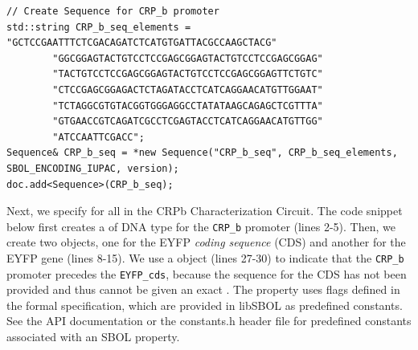 \begin{minipage}{0.95\textwidth}
\begin{lstlisting}[basicstyle=\tt\footnotesize]
// Create Sequence for CRP_b promoter
std::string CRP_b_seq_elements = "GCTCCGAATTTCTCGACAGATCTCATGTGATTACGCCAAGCTACG" 
		"GGCGGAGTACTGTCCTCCGAGCGGAGTACTGTCCTCCGAGCGGAG" 
		"TACTGTCCTCCGAGCGGAGTACTGTCCTCCGAGCGGAGTTCTGTC" 
		"CTCCGAGCGGAGACTCTAGATACCTCATCAGGAACATGTTGGAAT" 
		"TCTAGGCGTGTACGGTGGGAGGCCTATATAAGCAGAGCTCGTTTA" 
		"GTGAACCGTCAGATCGCCTCGAGTACCTCATCAGGAACATGTTGG" 
		"ATCCAATTCGACC"; 
Sequence& CRP_b_seq = *new Sequence("CRP_b_seq", CRP_b_seq_elements, SBOL_ENCODING_IUPAC, version);
doc.add<Sequence>(CRP_b_seq);
\end{lstlisting}
\end{minipage}

Next, we specify  for all  in the CRPb Characterization Circuit. The code snippet below first creates a  of DNA type for the \lstinline+CRP_b+ promoter (lines 2-5). Then, we create two  objects, one for the EYFP \emph{coding sequence} (CDS) and another for the EYFP gene (lines 8-15). We use a  object (lines 27-30) to indicate that the \lstinline+CRP_b+ promoter precedes the \lstinline+EYFP_cds+, because the sequence for the CDS has not been provided and thus cannot be given an exact . The  property uses flags defined in the formal specification, which are provided in libSBOL as predefined constants.  See the API documentation or the constants.h header file for predefined constants associated with an SBOL property.

